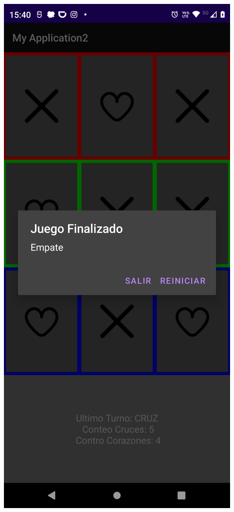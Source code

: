 \begin{frame}[fragile]
\begin{columns}
\begin{center}
\end{center}
\begin{center}
\includegraphics[width=0.95\linewidth]{00_ComportamientoAplicacionTicTacToe/Etapa3_Fase2B.png}  
\end{center}
\end{columns}
\end{frame}

